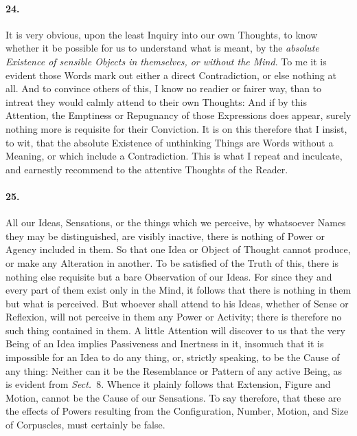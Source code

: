 \documentclass[]{article}
\newenvironment{sectionbody}{\begin{multicols}{2}}{\end{multicols}}
\begin{document}
\begin{sectionbody}
\paragraph{24.} It is very obvious, upon the least Inquiry into our own Thoughts,
to know whether it be possible for us to understand what is
meant, by the \emph{absolute Existence of sensible Objects in
themselves, or without the Mind}.  To me it is evident those
Words mark out either a direct Contradiction, or else nothing at
all.  And to convince others of this, I know no readier or fairer
way, than to intreat they would calmly attend to their own
Thoughts: And if by this Attention, the Emptiness or Repugnancy
of those Expressions does appear, surely nothing more is
requisite for their Conviction.  It is on this therefore that I
insist, to wit, that the absolute Existence of unthinking Things
are Words without a Meaning, or which include a Contradiction.
This is what I repeat and inculcate, and earnestly recommend to
the attentive Thoughts of the Reader.



\paragraph{25.} All our Ideas, Sensations, or the things which we perceive, by
whatsoever Names they may be distinguished, are visibly inactive,
there is nothing of Power or Agency included in them.  So that
one Idea or Object of Thought cannot produce, or make any
Alteration in another.  To be satisfied of the Truth of this,
there is nothing else requisite but a bare Observation of our
Ideas.  For since they and every part of them exist only in the
Mind, it follows that there is nothing in them but what is
perceived.  But whoever shall attend to his Ideas, whether of
Sense or Reflexion, will not perceive in them any Power or
Activity; there is therefore no such thing contained in them.
A little Attention will discover to us that the very Being of an
Idea implies Passiveness and Inertness in it, insomuch that it is
impossible for an Idea to do any thing, or, strictly speaking, to
be the Cause of any thing: Neither can it be the Resemblance or
Pattern of any active Being, as is evident from \emph{Sect.}~8.
Whence it plainly follows that Extension, Figure and Motion,
cannot be the Cause of our Sensations.  To say therefore, that
these are the effects of Powers resulting from the Configuration,
Number, Motion, and Size of Corpuscles, must certainly be false.




\end{sectionbody}
\end{document}
